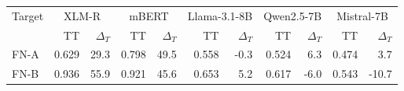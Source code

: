 \begin{tabular}{lrrrrrrrrrr}
\toprule
Target & \multicolumn{2}{c}{XLM-R} & \multicolumn{2}{c}{mBERT} & \multicolumn{2}{c}{Llama-3.1-8B} & \multicolumn{2}{c}{Qwen2.5-7B} & \multicolumn{2}{c}{Mistral-7B} \\
 & TT & $\Delta_T$ & TT & $\Delta_T$ & TT & $\Delta_T$ & TT & $\Delta_T$ & TT & $\Delta_T$ \\
\midrule
FN-A & 0.629 & 29.3 & 0.798 & 49.5 & 0.558 & -0.3 & 0.524 & 6.3 & 0.474 & 3.7 \\
FN-B & 0.936 & 55.9 & 0.921 & 45.6 & 0.653 & 5.2 & 0.617 & -6.0 & 0.543 & -10.7 \\
\bottomrule
\end{tabular}
